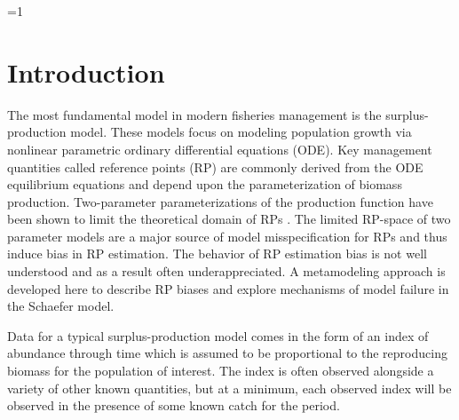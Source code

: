 \documentclass[12pt]{article}
\newcounter{alphasect}
\def\alphainsection{0}
\let\oldsection=\section
\def\section{%
  \ifnum\alphainsection=1%
    \addtocounter{alphasect}{1}
  \fi%
\oldsection}%
\begin{document}
\clearpage
{\color{gray}
\section{Introduction\label{int}}

%
The most fundamental model in modern fisheries management is the surplus-production 
model. These models focus on modeling population growth via nonlinear 
parametric ordinary differential equations (ODE). Key management quantities 
called reference points (RP) are commonly derived from the ODE equilibrium 
equations and depend upon the parameterization of biomass production. 
Two-parameter parameterizations of the production function have been shown to 
limit the theoretical domain of RPs . The 
limited RP-space of two parameter models are a major source of model 
misspecification for RPs and thus induce bias in RP estimation. The behavior 
of RP estimation bias is not well understood and as a result often 
underappreciated. A metamodeling approach is developed here to describe RP 
biases and explore mechanisms of model failure in the Schaefer model. 

%

Data for a typical surplus-production model comes in the form of an index 
of abundance through time which is assumed to be proportional to the reproducing 
biomass for the population of interest. The index is often observed alongside 
a variety of other known quantities, but at a minimum, each observed index 
will be observed in the presence of some known catch for the period. 

}
\end{document}
